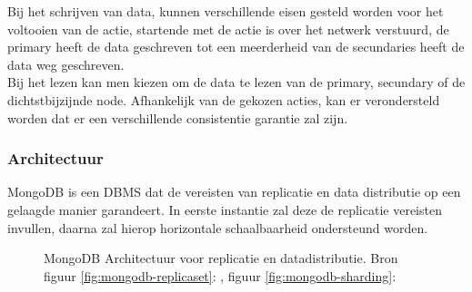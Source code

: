 Bij het schrijven van data, kunnen verschillende eisen gesteld worden voor het voltooien van de actie, startende met de actie is over het netwerk verstuurd, de primary heeft de data geschreven tot een meerderheid van de secundaries heeft de data weg geschreven. \\ Bij het lezen kan men kiezen om de data te lezen van de primary, secundary of de dichtstbijzijnde node. Afhankelijk van de gekozen acties, kan er verondersteld worden dat er een verschillende consistentie garantie zal zijn.

\subsubsection{Architectuur}
MongoDB is een DBMS dat de vereisten van replicatie en data distributie op een gelaagde manier garandeert. In eerste instantie zal deze de replicatie vereisten invullen, daarna zal hierop horizontale schaalbaarheid ondersteund worden. 

\begin{figure}[h!] 
\centering
	\hfill
	\caption{MongoDB Architectuur voor replicatie en datadistributie. Bron figuur \ref{fig:mongodb-replicaset}: \cite{mongodb-replicaset}, figuur \ref{fig:mongodb-sharding}: \cite{mongodb-shard}}
	\label{fig:mongodb-architectuur}
\end{figure}


